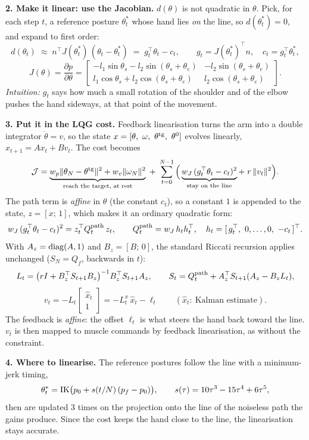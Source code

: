 \documentclass[11pt,a4paper]{article}
\begin{document}
\textbf{2. Make it linear: use the Jacobian.} $d(\theta)$ is not quadratic in $\theta$. Pick, for
each step $t$, a reference posture $\theta^*_t$ whose hand lies \emph{on} the line, so
$d(\theta^*_t)=0$, and expand to first order:
\[
d(\theta_t)\;\approx\;n^\top J(\theta^*_t)\,(\theta_t-\theta^*_t)\;=\;g_t^\top\theta_t-c_t,
\qquad g_t=J(\theta^*_t)^\top n,\quad c_t=g_t^\top\theta^*_t ,
\]
\[
J(\theta)=\frac{\partial p}{\partial\theta}=
\begin{bmatrix}-l_1\sin\theta_s-l_2\sin(\theta_s+\theta_e) & -l_2\sin(\theta_s+\theta_e)\\
l_1\cos\theta_s+l_2\cos(\theta_s+\theta_e) & l_2\cos(\theta_s+\theta_e)\end{bmatrix}.
\]
\emph{Intuition:} $g_t$ says how much a small rotation of the shoulder and of the elbow pushes the
hand sideways, at that point of the movement.

\textbf{3. Put it in the LQG cost.} Feedback linearisation turns the arm into a double integrator
$\ddot\theta=v$, so the state $x=[\theta,\ \omega,\ \theta^{\rm tg},\ \theta^0]$ evolves linearly,
$x_{t+1}=Ax_t+Bv_t$. The cost becomes
\[
\mathcal J=\underbrace{w_p\|\theta_N-\theta^{\rm tg}\|^2+w_v\|\omega_N\|^2}_{\text{reach the target, at rest}}
\;+\;\sum_{t=0}^{N-1}\Big(\underbrace{w_J\,(g_t^\top\theta_t-c_t)^2}_{\text{stay on the line}}
+\;r\,\|v_t\|^2\Big).
\]
The path term is \emph{affine} in $\theta$ (the constant $c_t$), so a constant $1$ is appended to
the state, $z=[x;\,1]$, which makes it an ordinary quadratic form:
\[
w_J\,(g_t^\top\theta_t-c_t)^2=z_t^\top Q^{\rm path}_t\,z_t,\qquad
Q^{\rm path}_t=w_J\,h_th_t^\top,\quad h_t=[\,g_t^\top,\ 0,\dots,0,\ -c_t\,]^\top .
\]
With $A_z={\rm diag}(A,1)$ and $B_z=[B;\,0]$, the standard Riccati recursion applies unchanged
($S_N=Q_f$, backwards in $t$):
\[
L_t=\big(rI+B_z^\top S_{t+1}B_z\big)^{-1}B_z^\top S_{t+1}A_z,\qquad
S_t=Q^{\rm path}_t+A_z^\top S_{t+1}(A_z-B_zL_t),
\]
\[
v_t=-L_t\begin{bmatrix}\hat x_t\\ 1\end{bmatrix}=-L^x_t\,\hat x_t-\ell_t \qquad(\hat x_t:\ \text{Kalman estimate}).
\]
The feedback is \emph{affine}: the offset $\ell_t$ is what steers the hand back toward the line.
$v_t$ is then mapped to muscle commands by feedback linearisation, as without the constraint.

\textbf{4. Where to linearise.} The reference postures follow the line with a minimum-jerk timing,
\[
\theta^*_t={\rm IK}\big(p_0+s(t/N)\,(p_f-p_0)\big),\qquad s(\tau)=10\tau^3-15\tau^4+6\tau^5 ,
\]
then are updated 3 times on the projection onto the line of the noiseless path the gains produce.
Since the cost keeps the hand close to the line, the linearisation stays accurate.
\end{document}
